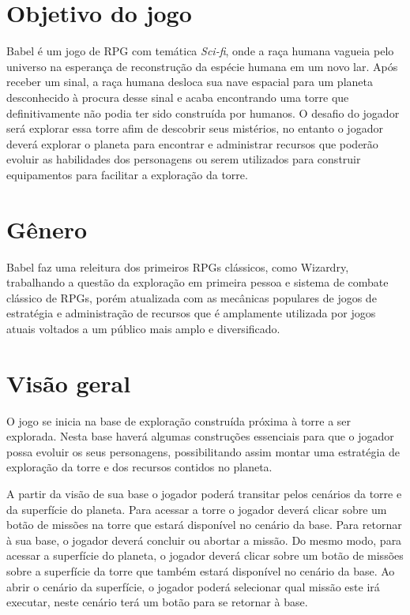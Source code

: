 \documentclass[11pt]{article} %
\begin{document}
\newpage

\section{Objetivo do jogo}

Babel é um jogo de RPG com temática \textit{Sci-fi}, onde a raça humana vagueia pelo universo na esperança de reconstrução da espécie humana em um novo lar. Após receber um sinal, a raça humana desloca sua nave espacial para um planeta desconhecido à procura desse sinal e acaba encontrando uma torre que definitivamente não podia ter sido construída por humanos. O desafio do jogador será explorar essa torre afim de descobrir seus mistérios, no entanto o jogador deverá explorar o planeta para encontrar e administrar recursos que poderão evoluir as habilidades dos personagens ou serem utilizados para construir equipamentos para facilitar a exploração da torre.

\section{Gênero}

Babel faz uma releitura dos primeiros RPGs clássicos, como Wizardry, trabalhando a questão da exploração em primeira pessoa e sistema de combate clássico de RPGs, porém atualizada com as mecânicas populares de jogos de estratégia e administração de recursos que é amplamente utilizada por jogos atuais voltados a um público mais amplo e diversificado.
 
\section{Visão geral}

O jogo se inicia na base de exploração construída próxima à torre a ser explorada. Nesta base haverá algumas construções essenciais para que o jogador possa evoluir os seus personagens, possibilitando assim montar uma estratégia de exploração da torre e dos recursos contidos no planeta.

A partir da visão de sua base o jogador poderá transitar pelos cenários da torre e da superfície do planeta. Para acessar a torre o jogador deverá clicar sobre um botão de missões na torre que estará disponível no cenário da base. Para retornar à sua base, o jogador deverá concluir ou abortar a missão. Do mesmo modo, para acessar a superfície do planeta, o jogador deverá clicar sobre um botão de missões sobre a superfície da torre que também estará disponível no cenário da base. Ao abrir o cenário da superfície, o jogador poderá selecionar qual missão este irá executar, neste cenário terá um botão para se retornar à base.
\end{document}
